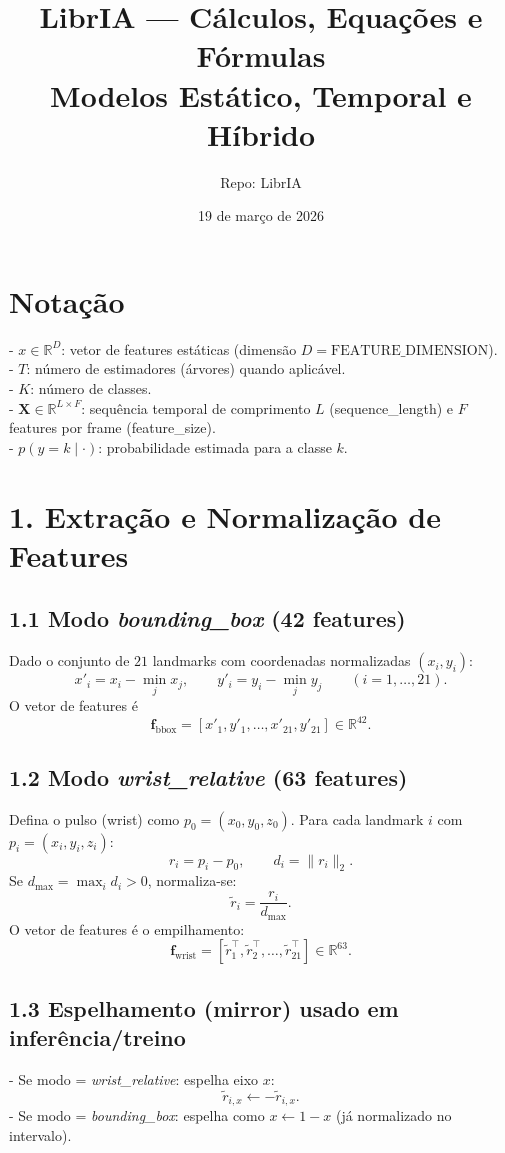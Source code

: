 \documentclass[12pt]{article}
\title{LibrIA — Cálculos, Equações e Fórmulas\\Modelos Estático, Temporal e Híbrido}
\author{Repo: LibrIA}
\date{19 de março de 2026}
\begin{document}
\sloppy
\maketitle
\section*{Notação}
- $x\in\mathbb{R}^D$: vetor de features estáticas (dimensão $D=\text{FEATURE\_DIMENSION}$).\\
- $T$: número de estimadores (árvores) quando aplicável.\\
- $K$: número de classes.\\
- $\mathbf{X}\in\mathbb{R}^{L\times F}$: sequência temporal de comprimento $L$ (sequence\_length) e $F$ features por frame (feature\_size).\\
- $p(y=k\mid\cdot)$: probabilidade estimada para a classe $k$.
\bigskip

\section*{1. Extração e Normalização de Features}
\subsection*{1.1 Modo \textit{bounding\_box} (42 features)}
Dado o conjunto de $21$ landmarks com coordenadas normalizadas $(x_i,y_i)$:
\[
x'_{i}=x_i-\min_j x_j,\qquad y'_{i}=y_i-\min_j y_j\qquad (i=1,\dots,21).
\]
O vetor de features é
\[
\mathbf{f}_{\text{bbox}} = [x'_1,y'_1,\dots,x'_{21},y'_{21}]\in\mathbb{R}^{42}.
\]

\subsection*{1.2 Modo \textit{wrist\_relative} (63 features)}
Defina o pulso (wrist) como $p_{0}=(x_0,y_0,z_0)$. Para cada landmark $i$ com $p_i=(x_i,y_i,z_i)$:
\[
r_i = p_i - p_0,\qquad d_i=\lVert r_i\rVert_2.
\]
Se $d_{\max}=\max_i d_i>0$, normaliza-se:
\[
\tilde r_i = \frac{r_i}{d_{\max}}.
\]
O vetor de features é o empilhamento:
\[
\mathbf{f}_{\text{wrist}} = [\tilde r_1^\top,\tilde r_2^\top,\dots,\tilde r_{21}^\top]\in\mathbb{R}^{63}.
\]

\subsection*{1.3 Espelhamento (mirror) usado em inferência/treino}
- Se modo = \textit{wrist\_relative}: espelha eixo $x$:
\[
\tilde r_{i,x} \leftarrow -\tilde r_{i,x}.
\]
- Se modo = \textit{bounding\_box}: espelha como $x \leftarrow 1-x$ (já normalizado no intervalo).
\end{document}
